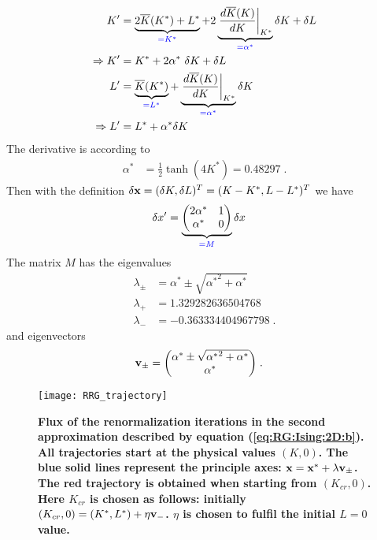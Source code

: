 %
\begin{align*}
K' &= 
\underbrace{2 \overline K(K^{*}) + L^{*}}_{\color{blue} = K^{*}} 
+ 2 \underbrace{
\eval{\frac{d \overline K(K)}{d K}}_{K^{*}}
}_{\color{blue} = \alpha^{*}}
\var  K
+ \var  L
\\
\Rightarrow K' &= K^* + 2\alpha^*~\var K + \var L\\
L' &= \underbrace{\overline K(K^{*})}_{\color{blue} = L^{*}} 
+ \underbrace{
\eval{\frac{d \overline K(K)}{d K}}_{K^{*}}
}_{\color{blue} = \alpha^{*}} \var  K \\
\Rightarrow L' &= L^* + \alpha^* \var K
\end{align*}
%
The derivative is according to 
%
\begin{align*}
\alpha^{*} &=  \frac{1}{2} \tanh(4 K^{*})
= 0.48297\;.
\end{align*}
%
Then with the definition  $\var \mathbf x = (\var K,\var L)^{T} = (K-K^{*},L-L^{*})^{T}$
we have
%
\begin{align*}
\var x'
&= 
\underbrace{
\mqty(2 \alpha^{*} & 1\\
\alpha^{*}&0
)
}_{\color{blue} = M}
\var x
\end{align*}
%
The matrix $M$ has the eigenvalues
%
\begin{align*}
\lambda_{\pm} &= \alpha^{*} \pm \sqrt{{\alpha^{*}}^{2} +\alpha^{*}}\\
\lambda_{+} &= 1.329282636504768\\
\lambda_{-} &= -0.363334404967798\;.
\end{align*}
%
and eigenvectors
%
\begin{align*}
\vv v_{\pm} &= 
\mqty(
\alpha^{*} \pm  \sqrt{{\alpha^{*}}^{2}+\alpha^{*}}\\\alpha^{*}
)\;.
\end{align*}
%

%
\begin{figure}[htbp]
\begin{center}
\texttt{[image: RRG\_trajectory]}
\caption{\bf Flux of the renormalization iterations in the second approximation
described by equation (\ref{eq:RG:Ising:2D:b}). 
All trajectories start at the physical values  $(K,0)$.
The blue solid lines represent the 
principle axes: $\mathbf x = \mathbf x^{*} + \lambda \mathbf v_{\pm}$. The red trajectory is obtained
when starting from $(K_{cr},0)$. Here $K_{cr}$ is chosen as follows: initially  $(K_{cr},0)
=(K^{*},L^{*}) + \eta \mathbf v_{-}$.   $\eta$ is chosen to fulfil the initial $L=0$ value.
}
\label{fig:rng:ising:2d:b}
\end{center}
\end{figure}

